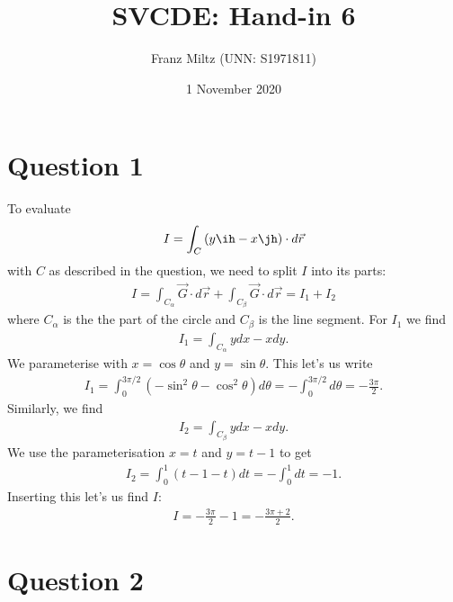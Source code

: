 \documentclass{article}
\begin{document}
\title{SVCDE: Hand-in 6}
\author{Franz Miltz (UNN: S1971811)}
\date{1 November 2020}
\maketitle


\section*{Question 1}


To evaluate
\begin{align*}
  I=\int_C \left(y\ih - x\jh\right)\cdot d\vec r
\end{align*}
with $C$ as described in the question, we need to split $I$ into its
parts:
\begin{align*}
  I = \int_{C_\alpha} \vec G \cdot d\vec r + \int_{C_\beta} \vec G \cdot d\vec r = I_1 + I_2
\end{align*}
where $C_\alpha$ is the the part of the circle and $C_\beta$ is the line segment.
For $I_1$ we find
\begin{align*}
  I_1 = \int_{C_\alpha} ydx-xdy.
\end{align*}
We parameterise with $x=\cos\theta$ and $y=\sin\theta$.
This let's us write
\begin{align*}
  I_1 = \int_0^{3\pi/2} \left(-\sin^2\theta - \cos^2\theta\right) d\theta
  =-\int_0^{3\pi/2}d\theta=-\frac{3\pi}{2}.
\end{align*}
Similarly, we find
\begin{align*}
  I_2 = \int_{C_\beta} ydx-xdy.
\end{align*}
We use the parameterisation $x=t$ and $y=t-1$ to get
\begin{align*}
  I_2 = \int_0^1 (t-1-t)dt=-\int_0^1 dt = -1.
\end{align*}
Inserting this let's us find $I$:
\begin{align*}
  I = -\frac{3\pi}{2}-1 = -\frac{3\pi + 2}{2}.
\end{align*}


\section*{Question 2}
\end{document}
